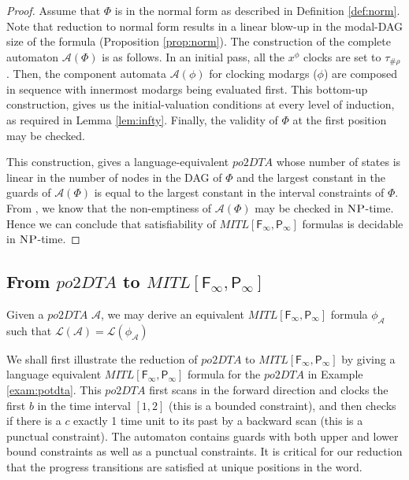 \documentclass{llncs}
\newcommand{\class}{\textsc}
\newcommand{\fut}{\textsf{F}}
\newcommand{\past}{\textsf{P}}
\newcommand{\potdta}{\mbox{$\mathit{po2DTA}$}}
\newcommand{\autm}{\mathcal A}
\newcommand{\mitlfpinf}{\mbox{$\mathit{MITL[\fut_\infty,\past_\infty]}$}}
\newcommand{\np}{\mbox{$\class{NP}$}}
\begin{document}
\begin{proof}
Assume that $\Phi$ is in the normal form as described in Definition \ref{def:norm}. Note that reduction to normal form results in a linear blow-up in the modal-DAG size of the formula (Proposition \ref{prop:norm}). 
The construction of the complete automaton $\autm(\Phi)$ is as follows.
In an initial pass, all the $x^\phi$ clocks are
set to $\tau_{\#\rho}$. Then, the component automata $\autm(\phi)$ for clocking modargs ($\phi$) are composed in sequence with innermost modargs being evaluated first. This bottom-up construction, gives us the initial-valuation conditions at every level of induction, as required in Lemma \ref{lem:infty}. Finally, the validity of $\Phi$ at the first position may be checked. 

This construction, gives a language-equivalent \potdta\/ whose number of states is linear in the number of nodes in the DAG of $\Phi$ and the largest constant in the guards of $\autm(\Phi)$ is equal to the largest constant in the interval constraints of $\Phi$. From \cite{PS10}, we know that the non-emptiness of $\autm(\Phi)$ may be checked in \np-time. Hence we can conclude that satisfiability of \mitlfpinf\/ formulas is decidable in \np-time.
\end{proof}
 


\subsection{From \potdta\/ to \mitlfpinf}
\begin{theorem}
Given a \potdta\/ $\autm$, we may derive an equivalent \mitlfpinf\/ formula $\phi_{\autm}$ such that $\mathcal L(\autm) = \mathcal L(\phi_{\autm})$
\end{theorem}


We shall first illustrate the reduction of $\potdta$ to $\mitlfpinf$ by giving a language 
equivalent \mitlfpinf\/ formula for the \potdta\/ in Example \ref{exam:potdta}. This \potdta\/ first scans in the forward direction and clocks the first $b$ in the time interval $[1,2]$ (this is a bounded constraint), and then checks if there is a $c$ exactly 1 time unit to its past by a backward scan (this is a punctual constraint).
The automaton contains guards with both upper and lower bound constraints as well as a punctual constraints. It is critical for our reduction that the progress transitions are satisfied at unique positions in the word. 
\end{document}
